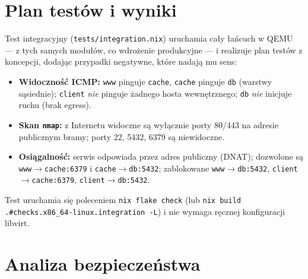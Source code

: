 \documentclass[11pt,a4paper]{article}
\begin{document}
\section{Plan testów i wyniki}
Test integracyjny (\texttt{tests/integration.nix}) uruchamia cały łańcuch w
QEMU --- z tych samych modułów, co wdrożenie produkcyjne --- i realizuje plan
testów z koncepcji, dodając przypadki negatywne, które nadają mu sens:

\begin{itemize}[nosep]
  \item \textbf{Widoczność ICMP:} \texttt{www} pinguje \texttt{cache},
  \texttt{cache} pinguje \texttt{db} (warstwy sąsiednie); \texttt{client}
  \emph{nie} pinguje żadnego hosta wewnętrznego; \texttt{db} \emph{nie}
  inicjuje ruchu (brak egress).
  \item \textbf{Skan \texttt{nmap}:} z Internetu widoczne są wyłącznie porty
  80/443 na adresie publicznym bramy; porty 22, 5432, 6379 są niewidoczne.
  \item \textbf{Osiągalność:} serwis odpowiada przez adres publiczny (DNAT);
  dozwolone są \texttt{www$\to$cache:6379} i \texttt{cache$\to$db:5432};
  zablokowane \texttt{www$\to$db:5432}, \texttt{client$\to$cache:6379},
  \texttt{client$\to$db:5432}.
\end{itemize}

Test uruchamia się poleceniem \texttt{nix flake check} (lub
\texttt{nix build .\#checks.x86\_64-linux.integration -L}) i nie wymaga ręcznej
konfiguracji libvirt.

\section{Analiza bezpieczeństwa}
\end{document}
